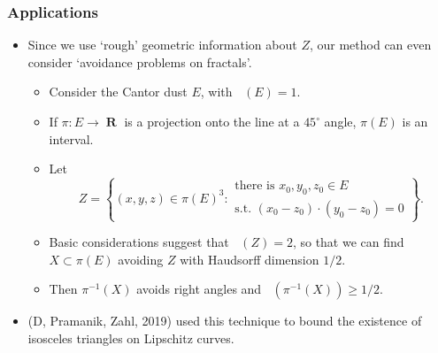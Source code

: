 \documentclass[usenames,dvipsnames,handout]{beamer}
\DeclareMathOperator{\RR}{\textbf{R}}
\DeclareMathOperator{\hausdim}{\text{dim}_{\textbf{H}}}
\DeclareMathOperator{\minkdim}{\text{dim}_{\textbf{M}}}
\begin{document}
\begin{frame}
    \frametitle{Applications}

    \begin{itemize}
        \item Since we use `rough' geometric information about $Z$, our method can even consider `avoidance problems on fractals'.

        \pause
        \begin{itemize}
            \item Consider the Cantor dust $E$, with $\minkdim(E) = 1$.

            \pause
            \item If $\pi: E \to \RR$ is a projection onto the line at a $45^{\circ}$ angle, $\pi(E)$ is an interval.

            \pause
            \item Let
            \[ Z = \left\{ (x,y,z) \in \pi(E)^3 : \begin{array}{c}
            \text{there is $x_0, y_0, z_0 \in E$}\\
            \text{s.t. $(x_0 - z_0) \cdot (y_0 - z_0) = 0$}
        \end{array} \right\}. \]

            \pause
            \item Basic considerations suggest that $\minkdim(Z) = 2$, so that we can find $X \subset \pi(E)$ avoiding $Z$ with Haudsorff dimension $1/2$.

            \pause
            \item Then $\pi^{-1}(X)$ avoids right angles and $\hausdim(\pi^{-1}(X)) \geq 1/2$.
        \end{itemize}

        \pause
        \item (D, Pramanik, Zahl, 2019) used this technique to bound the existence of isosceles triangles on Lipschitz curves.
    \end{itemize}
\end{frame}
\end{document}
